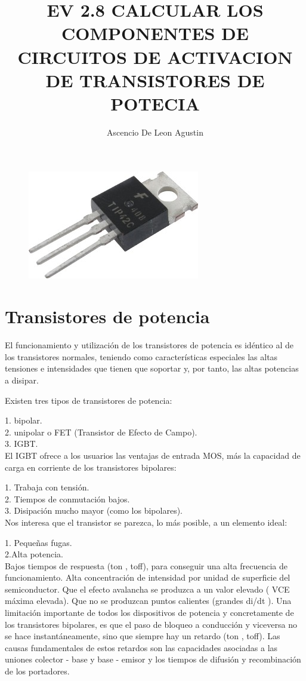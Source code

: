 \documentclass[10pt,letterpaper]{article}
\title{EV 2.8 CALCULAR LOS COMPONENTES DE CIRCUITOS DE ACTIVACION DE TRANSISTORES DE POTECIA}
\author{Ascencio De Leon Agustin}
\begin{document}
\maketitle
\begin{figure}[h!]
\centering 
\includegraphics[scale=1]{1}
\end{figure}
\newpage
\section{Transistores de potencia}
El funcionamiento y utilización de los transistores de potencia es idéntico al de los transistores normales, teniendo como características especiales las altas tensiones e intensidades que tienen que soportar y, por tanto, las altas potencias a disipar.

Existen tres tipos de transistores de potencia:

1. bipolar.\\
2. unipolar o FET (Transistor de Efecto de Campo).\\
3. IGBT.\\
El IGBT ofrece a los usuarios las ventajas de entrada MOS, más la capacidad de carga en corriente de los transistores bipolares:

1. Trabaja con tensión.\\
2. Tiempos de conmutación bajos.\\
3. Disipación mucho mayor (como los bipolares).\\
Nos interesa que el transistor se parezca, lo más posible, a un elemento ideal:

1. Pequeñas fugas.\\
2.Alta potencia.\\
Bajos tiempos de respuesta (ton , toff), para conseguir una alta frecuencia de funcionamiento.
Alta concentración de intensidad por unidad de superficie del semiconductor.
Que el efecto avalancha se produzca a un valor elevado ( VCE máxima elevada).
Que no se produzcan puntos calientes (grandes di/dt ).
Una limitación importante de todos los dispositivos de potencia y concretamente de los transistores bipolares, es que el paso de bloqueo a conducción y viceversa no se hace instantáneamente, sino que siempre hay un retardo (ton , toff). Las causas fundamentales de estos retardos son las capacidades asociadas a las uniones colector - base y base - emisor y los tiempos de difusión y recombinación de los portadores.
\end{document}
